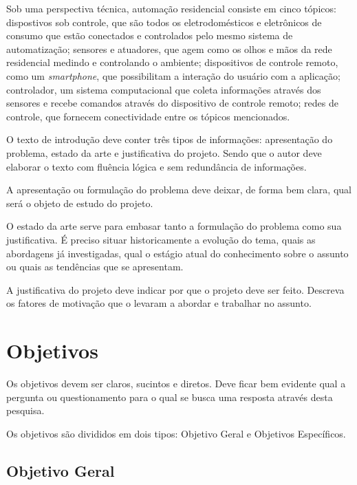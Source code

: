 \documentclass[
    12pt,               %
    a4paper,            %
    english,            %
    brazil,             %
    ]{article}
\begin{document}
Sob uma perspectiva técnica, automação residencial consiste em cinco tópicos: dispostivos sob controle, que são todos os eletrodomésticos e eletrônicos de consumo que estão conectados e controlados
pelo mesmo sistema de automatização; sensores e atuadores, que agem como os olhos e mãos da rede residencial medindo e controlando o ambiente; dispositivos de controle remoto, como um \textit{smartphone},
que possibilitam a interação do usuário com a aplicação; controlador, um sistema computacional que coleta informações através dos sensores e recebe comandos através do dispositivo de controle remoto; redes
de controle, que fornecem conectividade entre os tópicos mencionados. \cite{kyas2013}



O texto de introdução deve conter três tipos de informações: apresentação do problema, estado da arte e justificativa do projeto.  Sendo que o autor deve elaborar
o texto com fluência lógica e sem redundância de informações.

A apresentação ou formulação do problema deve deixar, de forma bem clara, qual será o objeto de estudo do projeto.

O estado da arte serve para embasar tanto a formulação do problema como sua justificativa. É preciso situar historicamente a evolução do tema,
quais as abordagens já investigadas, qual o estágio atual do conhecimento sobre o assunto ou quais as tendências que se apresentam.

A justificativa do projeto deve indicar por que o projeto deve ser feito. Descreva os fatores de motivação que o levaram a abordar e trabalhar no assunto.

\section{Objetivos}



Os objetivos devem ser claros, sucintos e diretos. Deve ficar bem evidente qual a pergunta ou questionamento para o qual se busca uma resposta através desta pesquisa.

Os objetivos são divididos em dois tipos: Objetivo Geral e Objetivos Específicos.

\subsection{Objetivo Geral}
\end{document}
